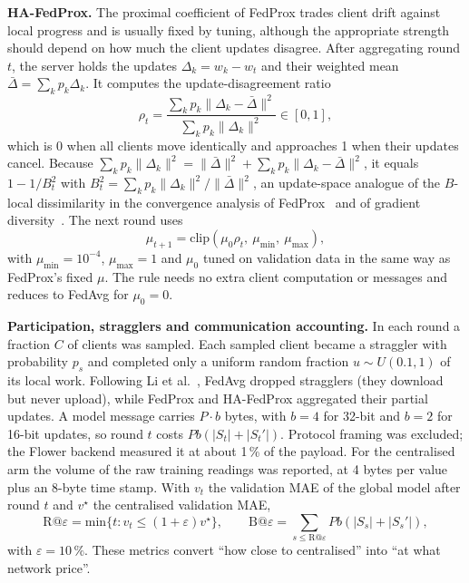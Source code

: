\textbf{HA-FedProx.} The proximal coefficient of FedProx trades client drift against local progress and is usually
fixed by tuning, although the appropriate strength should depend on how much the client updates disagree. After
aggregating round $t$, the server holds the updates $\Delta_k=w_k-w_t$ and their weighted mean
$\bar{\Delta}=\sum_k p_k\Delta_k$. It computes the update-disagreement ratio
\begin{equation}\label{eq:rho}
\rho_t=\frac{\sum_k p_k\lVert\Delta_k-\bar{\Delta}\rVert^2}{\sum_k p_k\lVert\Delta_k\rVert^2}\in[0,1],
\end{equation}
which is 0 when all clients move identically and approaches 1 when their updates cancel. Because
$\sum_k p_k\lVert\Delta_k\rVert^2=\lVert\bar{\Delta}\rVert^2+\sum_k p_k\lVert\Delta_k-\bar{\Delta}\rVert^2$, it equals
$1-1/B_t^2$ with $B_t^2=\sum_k p_k\lVert\Delta_k\rVert^2/\lVert\bar{\Delta}\rVert^2$, an update-space analogue of the
$B$-local dissimilarity in the convergence analysis of FedProx~\cite{li2020fedprox} and of gradient
diversity~\cite{yin2018diversity}. The next round uses
\begin{equation}\label{eq:mu}
\mu_{t+1}=\mathrm{clip}\left(\mu_0\rho_t,\ \mu_{\mathrm{min}},\ \mu_{\mathrm{max}}\right),
\end{equation}
with $\mu_{\mathrm{min}}=10^{-4}$, $\mu_{\mathrm{max}}=1$ and $\mu_0$ tuned on validation data in the same way as FedProx's fixed
$\mu$. The rule needs no extra client computation or messages and reduces to FedAvg for $\mu_0=0$.

\textbf{Participation, stragglers and communication accounting.} In each round a fraction $C$ of clients was sampled.
Each sampled client became a straggler with probability $p_s$ and completed only a uniform random fraction
$u\sim U(0.1,1)$ of its local work. Following Li et al.~\cite{li2020fedprox}, FedAvg dropped stragglers (they download
but never upload), while FedProx and HA-FedProx aggregated their partial updates. A model message carries $P\cdot b$
bytes, with $b=4$ for 32-bit and $b=2$ for 16-bit updates, so round $t$ costs $Pb(|S_t|+|S_t'|)$. Protocol framing
was excluded; the Flower backend measured it at about 1\,\% of the payload. For the centralised arm the volume of the
raw training readings was reported, at 4 bytes per value plus an 8-byte time stamp. With $v_t$ the validation MAE of
the global model after round $t$ and $v^\star$ the centralised validation MAE,
\begin{equation}\label{eq:beps}
\mathrm{R@}\varepsilon=\mathrm{min}\{t:v_t\le(1+\varepsilon)v^\star\},\qquad \mathrm{B@}\varepsilon=\sum_{s\le \mathrm{R@}\varepsilon}Pb\left(|S_s|+|S_s'|\right),
\end{equation}
with $\varepsilon=10\,\%$. These metrics convert ``how close to centralised'' into ``at what network price''.

